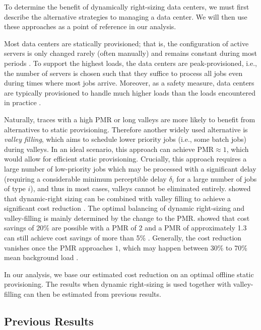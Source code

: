 To determine the benefit of dynamically right-sizing data centers, we must first describe the alternative strategies to managing a data center. We will then use these approaches as a point of reference in our analysis.

Most data centers are statically provisioned; that is, the configuration of active servers is only changed rarely (often manually) and remains constant during most periods \cite{Whitney2014}. To support the highest loads, the data centers are peak-provisioned, i.e., the number of servers is chosen such that they suffice to process all jobs even during times where most jobs arrive. Moreover, as a safety measure, data centers are typically provisioned to handle much higher loads than the loads encountered in practice \cite{Whitney2014}.

Naturally, traces with a high PMR or long valleys are more likely to benefit from alternatives to static provisioning. Therefore another widely used alternative is \emph{valley filling}, which aims to schedule lower priority jobs (i.e., some batch jobs) during valleys. In an ideal scenario, this approach can achieve $\text{PMR} \approx 1$, which would allow for efficient static provisioning. Crucially, this approach requires a large number of low-priority jobs which may be processed with a significant delay (requiring a considerable minimum perceptible delay $\delta_i$ for a large number of jobs of type $i$), and thus in most cases, valleys cannot be eliminated entirely. \citeauthor*{Lin2011} showed that dynamic-right sizing can be combined with valley filling to achieve a significant cost reduction \cite{Lin2011}. The optimal balancing of dynamic right-sizing and valley-filling is mainly determined by the change to the PMR. \citeauthor*{Lin2011} showed that cost savings of 20\% are possible with a PMR of 2 and a PMR of approximately 1.3 can still achieve cost savings of more than 5\% \cite{Lin2011}. Generally, the cost reduction vanishes once the PMR approaches $1$, which may happen between 30\% to 70\% mean background load \cite{Lin2011}.

In our analysis, we base our estimated cost reduction on an optimal offline static provisioning. The results when dynamic right-sizing is used together with valley-filling can then be estimated from previous results.

\subsection{Previous Results}

